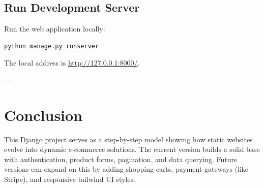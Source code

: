 \documentclass[12pt,a4paper]{report}
\begin{document}
\section{Run Development Server}
Run the web application locally:
\begin{lstlisting}[language=bash]
python manage.py runserver
\end{lstlisting}
The local address is \url{http://127.0.0.1:8000/}.

---

\chapter{Conclusion}
This Django project serves as a step-by-step model showing how static websites evolve into dynamic e-commerce solutions. The current version builds a solid base with authentication, product forms, pagination, and data querying. Future versions can expand on this by adding shopping carts, payment gateways (like Stripe), and responsive tailwind UI styles.
\end{document}
